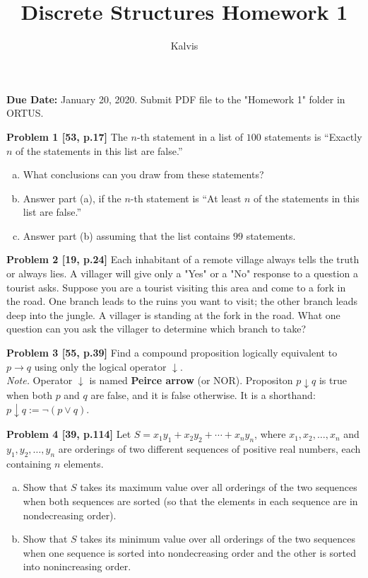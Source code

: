 \documentclass[jou]{apa6}
\title{Discrete Structures \textendash{} Homework 1}
\author{Kalvis}
\affiliation{RBS}
\begin{document}
\maketitle
\noindent
{\bf Due Date:} January 20, 2020. Submit PDF file to the "Homework 1" folder in ORTUS.

\vspace{2ex}
{\bf Problem 1 [53, p.17]} The $n$-th statement in a list of $100$ statements is
``Exactly $n$ of the statements in this list are false.'' 
\begin{enumerate}[(a)]
\item What conclusions can you draw from these statements?
\item Answer part (a), if the $n$-th statement is ``At least $n$ of 
the statements in this list are false.''
\item Answer part (b) assuming that the list contains $99$ statements.
\end{enumerate}

\vspace{2ex}
{\bf Problem 2 [19, p.24]} Each inhabitant of a remote village always tells the 
truth or always lies. A villager will give only a "Yes" or a "No" response
to a question a tourist asks. Suppose you are a tourist visiting this area and come
to a fork in the road. One branch leads to the ruins you want to visit; the
other branch leads deep into the jungle. A villager is standing at the fork in the road. 
What one question can you ask the villager to determine which branch to take?

\vspace{2ex}
{\bf Problem 3 [55, p.39]} 
Find a compound proposition logically equivalent to $p \rightarrow q$ using 
only the logical operator $\downarrow$.\\
{\em Note.} Operator $\downarrow$ is named {\bf Peirce arrow} (or NOR). 
Propositon $p \downarrow q$ is true when both $p$ and $q$ are false, and it is 
false otherwise. It is a shorthand: $p \downarrow q := \neg(p \vee q)$. 

\vspace{2ex}
{\bf Problem 4 [39, p.114]} 
Let $S = x_1y_1 + x_2y_2 + \cdots + x_ny_n$, where $x_1,x_2,\ldots,x_n$
and $y_1,y_2,\ldots,y_n$ are orderings of two different sequences
of positive real numbers, each containing $n$ elements.
\begin{enumerate}[(a)]
\item Show that $S$ takes its maximum value over all orderings of the two 
sequences when both sequences are sorted (so that the elements in each 
sequence are in nondecreasing order). 
\item Show that $S$ takes its minimum value over all orderings of the two 
sequences when one sequence is sorted into nondecreasing order and the other 
is sorted into nonincreasing order.
\end{enumerate}
\end{document}
